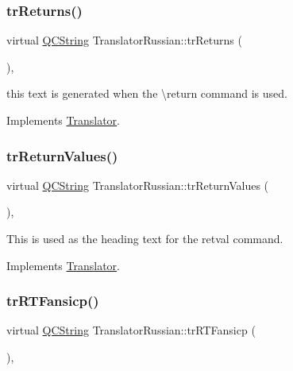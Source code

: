 \subsubsection{\texorpdfstring{trReturns()}{trReturns()}}
{\footnotesize\ttfamily virtual \mbox{\hyperlink{class_q_c_string}{Q\+C\+String}} Translator\+Russian\+::tr\+Returns (\begin{DoxyParamCaption}{ }\end{DoxyParamCaption})\hspace{0.3cm}{\ttfamily [inline]}, {\ttfamily [virtual]}}

this text is generated when the \textbackslash{}return command is used. 

Implements \mbox{\hyperlink{class_translator}{Translator}}.

\mbox{\label{class_translator_russian_a3f204bdad000e4c943d79f08c217cfc2}} 
\subsubsection{\texorpdfstring{trReturnValues()}{trReturnValues()}}
{\footnotesize\ttfamily virtual \mbox{\hyperlink{class_q_c_string}{Q\+C\+String}} Translator\+Russian\+::tr\+Return\+Values (\begin{DoxyParamCaption}{ }\end{DoxyParamCaption})\hspace{0.3cm}{\ttfamily [inline]}, {\ttfamily [virtual]}}

This is used as the heading text for the retval command. 

Implements \mbox{\hyperlink{class_translator}{Translator}}.

\mbox{\label{class_translator_russian_aa913c332e155b0972fce4645cfd97b10}} 
\subsubsection{\texorpdfstring{trRTFansicp()}{trRTFansicp()}}
{\footnotesize\ttfamily virtual \mbox{\hyperlink{class_q_c_string}{Q\+C\+String}} Translator\+Russian\+::tr\+R\+T\+Fansicp (\begin{DoxyParamCaption}{ }\end{DoxyParamCaption})\hspace{0.3cm}{\ttfamily [inline]}, {\ttfamily [virtual]}}

